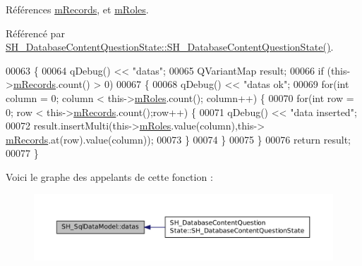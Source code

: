 Références \hyperlink{classSH__SqlDataModel_aa58096989daac3cd3fdea5e6dd4f27ee}{m\-Records}, et \hyperlink{classSH__SqlDataModel_ad1e46c72a6aeb83e3e7bb0c3110d12a4}{m\-Roles}.



Référencé par \hyperlink{classSH__DatabaseContentQuestionState_ab26490ea519262a8f9ca72c000bf7313}{S\-H\-\_\-\-Database\-Content\-Question\-State\-::\-S\-H\-\_\-\-Database\-Content\-Question\-State()}.


\begin{DoxyCode}
00063 \{
00064     qDebug() << \textcolor{stringliteral}{"datas"};
00065     QVariantMap result;
00066     \textcolor{keywordflow}{if} (this->\hyperlink{classSH__SqlDataModel_aa58096989daac3cd3fdea5e6dd4f27ee}{mRecords}.count() > 0)
00067     \{
00068         qDebug() << \textcolor{stringliteral}{"datas ok"};
00069         \textcolor{keywordflow}{for}(\textcolor{keywordtype}{int} column = 0; column < this->\hyperlink{classSH__SqlDataModel_ad1e46c72a6aeb83e3e7bb0c3110d12a4}{mRoles}.count(); column++) \{
00070             \textcolor{keywordflow}{for}(\textcolor{keywordtype}{int} row = 0; row < this->\hyperlink{classSH__SqlDataModel_aa58096989daac3cd3fdea5e6dd4f27ee}{mRecords}.count();row++) \{
00071                 qDebug() << \textcolor{stringliteral}{"data inserted"};
00072                 result.insertMulti(this->\hyperlink{classSH__SqlDataModel_ad1e46c72a6aeb83e3e7bb0c3110d12a4}{mRoles}.value(column),this->
      \hyperlink{classSH__SqlDataModel_aa58096989daac3cd3fdea5e6dd4f27ee}{mRecords}.at(row).value(column));
00073             \}
00074         \}
00075     \}
00076     \textcolor{keywordflow}{return} result;
00077 \}
\end{DoxyCode}


Voici le graphe des appelants de cette fonction \-:
\nopagebreak
\begin{figure}[H]
\begin{center}
\leavevmode
\includegraphics[width=350pt]{classSH__SqlDataModel_a6d91d42cfaf86d1fbbaeeb7a32efc26b_icgraph}
\end{center}
\end{figure}


